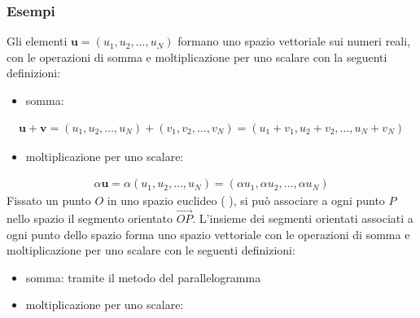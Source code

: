 \documentclass[letterpaper,10pt,english]{jupyterBook}
\begin{document}
\subsubsection{Esempi}
\label{\detokenize{ch/algebra/vector-algebra-def:esempi}}
\sphinxAtStartPar
{}
Gli elementi \(\mathbf{u} = (u_1, u_2, \dots, u_N)\) formano uno spazio vettoriale sui numeri reali, con le operazioni di somma e moltiplicazione per uno scalare con la seguenti definizioni:
\begin{itemize}
\item {} 
\sphinxAtStartPar
somma:

\end{itemize}
\begin{equation*}
\begin{split}
  \mathbf{u} + \mathbf{v} = (u_1, u_2, \dots, u_N) + (v_1, v_2, \dots, v_N) = (u_1+v_1, u_2+v_2, \dots, u_N+v_N)
\end{split}
\end{equation*}\begin{itemize}
\item {} 
\sphinxAtStartPar
moltiplicazione per uno scalare:

\end{itemize}
\begin{equation*}
\begin{split}
  \alpha \mathbf{u}       = \alpha (u_1, u_2, \dots, u_N)                   = (\alpha u_1, \alpha u_2, \dots, \alpha u_N)
\end{split}
\end{equation*}
\sphinxAtStartPar
{}
Fissato un punto \(O\) in uno spazio euclideo ( ), si può associare a ogni punto \(P\) nello spazio il segmento orientato \(\overrightarrow{OP}\). L’insieme dei segmenti orientati associati a ogni punto dello spazio forma uno spazio vettoriale con le operazioni di somma e moltiplicazione per uno scalare con le seguenti definizioni:
\begin{itemize}
\item {} 
\sphinxAtStartPar
somma: tramite il metodo del parallelogramma 

\item {} 
\sphinxAtStartPar
moltiplicazione per uno scalare: 

\end{itemize}
\end{document}
